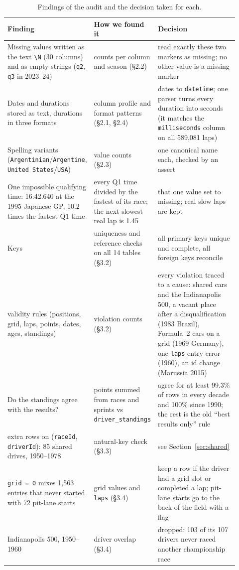 \documentclass[10pt,a4paper]{article}
\newcommand{\code}[1]{\texttt{#1}}
\begin{document}
\begin{table}[H]
\centering\small
\caption{Findings of the audit and the decision taken for each.}\label{tab:audit}
\begin{tabular}{>{\raggedright\arraybackslash}p{0.30\linewidth}>{\raggedright\arraybackslash}p{0.22\linewidth}>{\raggedright\arraybackslash}p{0.40\linewidth}}
\toprule
Finding & How we found it & Decision \\
\midrule
Missing values written as the text \code{\textbackslash N} (30 columns) and as empty strings (\code{q2}, \code{q3} in 2023--24) & counts per column and season (\S2.2) & read exactly these two markers as missing; no other value is a missing marker \\
Dates and durations stored as text, durations in three formats & column profile and format patterns (\S2.1, \S2.4) & dates to \code{datetime}; one parser turns every duration into seconds (it matches the \code{milliseconds} column on all 589,081 laps) \\
Spelling variants (\code{Argentinian}/\code{Argentine}, \code{United States}/\code{USA}) & value counts (\S2.3) & one canonical name each, checked by an assert \\
One impossible qualifying time: 16:42.640 at the 1995 Japanese GP, 10.2 times the fastest Q1 time & every Q1 time divided by the fastest of its race; the next slowest real lap is 1.45 & that one value set to missing; real slow laps are kept \\
Keys & uniqueness and reference checks on all 14 tables (\S3.2) & all primary keys unique and complete, all foreign keys reconcile \\
13 validity rules (positions, grid, laps, points, dates, ages, standings) & violation counts (\S3.2) & every violation traced to a cause: shared cars and the Indianapolis 500, a vacant place after a disqualification (1983 Brazil), Formula~2 cars on a grid (1969 Germany), one \code{laps} entry error (1960), an id change (Marussia 2015) \\
Do the standings agree with the results? & points summed from races and sprints vs \code{driver\_standings} & agree for at least 99.3\% of rows in every decade and 100\% since 1990; the rest is the old ``best results only'' rule \\
91 extra rows on (\code{raceId}, \code{driverId}): 85 shared drives, 1950--1978 & natural-key check (\S3.3) & see Section~\ref{sec:shared} \\
\code{grid = 0} mixes 1,563 entries that never started with 72 pit-lane starts & grid values and \code{laps} (\S3.4) & keep a row if the driver had a grid slot or completed a lap; pit-lane starts go to the back of the field with a flag \\
Indianapolis 500, 1950--1960 & driver overlap (\S3.4) & dropped: 103 of its 107 drivers never raced another championship race \\
\bottomrule
\end{tabular}
\end{table}
\end{document}
